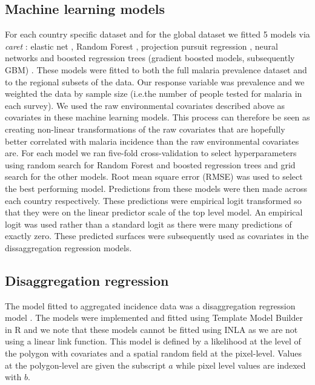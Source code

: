 \documentclass[review]{elsarticle}
\begin{document}
\subsection{Machine learning models}
For each country specific dataset and for the global dataset we fitted 5 models via \emph{caret} \citep{caret}: elastic net \citep{enet}, Random Forest \citep{wright2015ranger}, projection pursuit regression \citep{friedman1981projection}, neural networks \citep{nnet} and boosted regression trees (gradient boosted models, subsequently GBM) \citep{gbm}.
These models were fitted to both the full malaria prevalence dataset and to the regional subsets of the data.
Our response variable was prevalence and we weighted the data by sample size (i.e.\thinspace the number of people tested for malaria in each survey).
We used the raw environmental covariates described above as covariates in these machine learning models.
This process can therefore be seen as creating non-linear transformations of the raw covariates that are hopefully better correlated with malaria incidence than the raw environmental covariates are.
For each model we ran five-fold cross-validation to select hyperparameters using random search for Random Forest and boosted regression trees and grid search for the other models. 
Root mean square error (RMSE) was used to select the best performing model.
Predictions from these models were then made across each country respectively.
These predictions were empirical logit transformed so that they were on the linear predictor scale of the top level model.
An empirical logit was used rather than a standard logit as there were many predictions of exactly zero.
These predicted surfaces were subsequently used as covariates in the dissaggregation regression models.

\subsection{Disaggregation regression}
The model fitted to aggregated incidence data was a disaggregation regression model \citep{sturrock2014fine, wilson2017pointless, law2018variational, taylor2017continuous, li2012log}.
The models were implemented and fitted using Template Model Builder \citep{TMB} in R \citep{R} and we note that these models cannot be fitted using INLA \citep{INLA} as we are not using a linear link function.
This model is defined by a likelihood at the level of the polygon with covariates and a spatial random field at the pixel-level. 
Values at the polygon-level are given the subscript $a$ while pixel level values are indexed with $b$.
\end{document}
